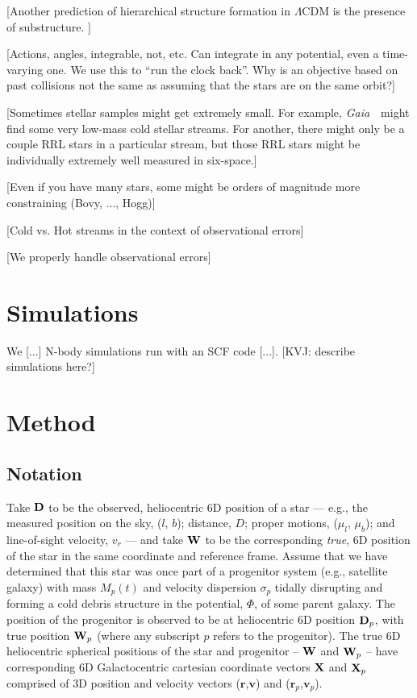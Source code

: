 \documentclass[letterpaper,12pt,preprint]{aastex}
\newcommand{\project}[1]{\textsl{#1}}
\newcommand{\gaia}{\project{Gaia}~}
\newcommand{\D}{{\bf D}}
\newcommand{\W}{{\bf W}}
\newcommand{\X}{{\bf X}}
\newcommand{\bsr}{\boldsymbol r}
\newcommand{\bsv}{\boldsymbol v}
\begin{document}
[Another prediction of hierarchical structure formation in $\Lambda$CDM is the presence of substructure. ]


[Actions, angles, integrable, not, etc.  Can integrate in any
  potential, even a time-varying one. We use this to
  ``run the clock back''.  Why is an objective based on past collisions not the
  same as assuming that the stars are on the same orbit?]

[Sometimes stellar samples might get extremely small.  For example,
  \gaia\ might find some very low-mass cold stellar streams.  For
  another, there might only be a couple RRL stars in a particular
  stream, but those RRL stars might be individually extremely well
  measured in six-space.]

[Even if you have many stars, some might be orders of magnitude more constraining (Bovy, ..., Hogg)]

[Cold vs. Hot streams in the context of observational errors]

[We properly handle observational errors]

\section{Simulations}\label{sec:sims}

We [...] N-body simulations run with an SCF code [...]. [KVJ: describe simulations here?]

\section{Method}

\subsection{Notation}
Take $\D$ to be the observed, heliocentric 6D position of a star --- e.g., the measured position on the sky, ($l$, $b$); distance, $D$; proper motions, ($\mu_l$, $\mu_b$); and line-of-sight velocity, $v_r$ --- and take $\W$ to be the corresponding \emph{true}, 6D position of the star in the same coordinate and reference frame. Assume that we have determined that this star was once part of a progenitor system (e.g., satellite galaxy) with mass $M_p(t)$ and velocity dispersion $\sigma_p$ tidally disrupting and forming a cold debris structure in the potential, $\Phi$, of some parent galaxy. The position of the progenitor is observed to be at heliocentric 6D position $\D_p$, with true position $\W_p$ (where any subscript $p$ refers to the progenitor). The true 6D heliocentric spherical positions of the star and progenitor -- $\W$ and $\W_p$ -- have corresponding 6D Galactocentric cartesian coordinate vectors $\X$ and $\X_p$ comprised of 3D position and velocity vectors ($\bsr$,$\bsv$) and ($\bsr_p$,$\bsv_p$). 
\end{document}
